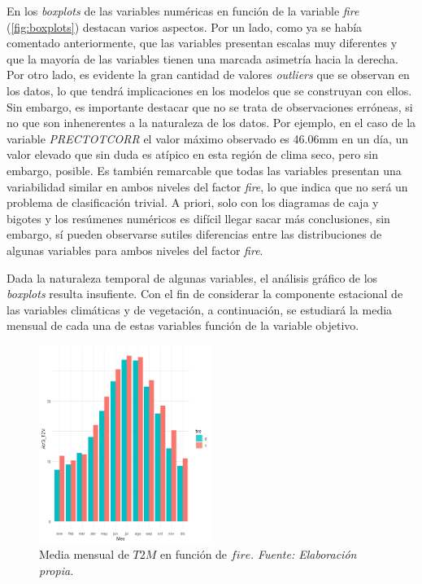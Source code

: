 \documentclass[12pt,a4paper,]{book}
\numberwithin{dummy}{section}
\theoremstyle{ocrenumbox}
\theoremstyle{blacknumex}
\theoremstyle{blacknumbox}
\theoremstyle{ocrenum}
\theoremstyle{ocrenum}
\begin{document}
En los \emph{boxplots} de las variables numéricas en función de la
variable \emph{fire} (\ref{fig:boxplots}) destacan varios aspectos. Por
un lado, como ya se había comentado anteriormente, que las variables
presentan escalas muy diferentes y que la mayoría de las variables
tienen una marcada asimetría hacia la derecha. Por otro lado, es
evidente la gran cantidad de valores \emph{outliers} que se observan en
los datos, lo que tendrá implicaciones en los modelos que se construyan
con ellos. Sin embargo, es importante destacar que no se trata de
observaciones erróneas, si no que son inhenerentes a la naturaleza de
los datos. Por ejemplo, en el caso de la variable \emph{PRECTOTCORR} el
valor máximo observado es 46.06mm en un día, un valor elevado que sin
duda es atípico en esta región de clima seco, pero sin embargo, posible.
Es también remarcable que todas las variables presentan una variabilidad
similar en ambos niveles del factor \emph{fire}, lo que indica que no
será un problema de clasificación trivial. A priori, solo con los
diagramas de caja y bigotes y los resúmenes numéricos es difícil llegar
sacar más conclusiones, sin embargo, sí pueden observarse sutiles
diferencias entre las distribuciones de algunas variables para ambos
niveles del factor \emph{fire}.

Dada la naturaleza temporal de algunas variables, el análisis gráfico de
los \emph{boxplots} resulta insufiente. Con el fin de considerar la
componente estacional de las variables climáticas y de vegetación, a
continuación, se estudiará la media mensual de cada una de estas
variables función de la variable objetivo.

\begin{figure}[H]
\centering
\includegraphics[width = 0.5\textwidth]{graficos/T2M_mes.png}
\caption{Media mensual de $T2M$ en función de $fire$. \it Fuente: Elaboración propia.}
\label{fig:T2M_mes}
\end{figure}
\end{document}
